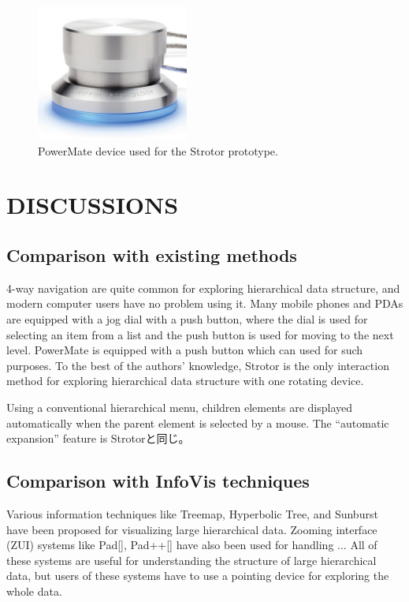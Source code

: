 \documentclass{article}
\begin{document}
\begin{figure}[H]
\centerline{\includegraphics[width=50mm,bb=0 0 389 348]{figures/d3a69499f7e7314ae6dc10f5bf3a2be5.png}}
\caption{PowerMate device used for the Strotor prototype.}
\label{powermate}
\end{figure}

\section*{DISCUSSIONS}

\subsection{Comparison with existing methods}

4-way navigation are quite common for exploring hierarchical data structure,
and modern computer users have no problem using it.
Many mobile phones and PDAs are equipped with a jog dial with a push button,
where the dial is used for selecting an item from a list and 
the push button is used for moving to the next level.
PowerMate is equipped with a push button which can used for such purposes.
To the best of the authors' knowledge,
Strotor is the only interaction method for exploring hierarchical data structure
with one rotating device.

Using a conventional hierarchical menu, children elements are displayed automatically
when the parent element is selected by a mouse.
The ``automatic expansion'' feature is Strotorと同じ。

\subsection{Comparison with InfoVis techniques}

Various information techniques like
Treemap\cite{Johnson:1991:TSA:949607.949654},
Hyperbolic Tree\cite{Lamping:1995:FTB:223904.223956},
and Sunburst\cite{Stasko:2000:FDN:857190.857683}
have been proposed for visualizing large hierarchical data.
Zooming interface (ZUI) systems like Pad[], Pad++[]
have also been used for handling ...
All of these systems are useful for understanding the structure of
large hierarchical data, but users of these systems have to use a pointing device
for exploring the whole data.
\end{document}
